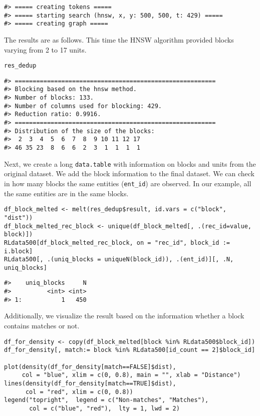 \begin{verbatim}
#> ===== creating tokens =====
#> ===== starting search (hnsw, x, y: 500, 500, t: 429) =====
#> ===== creating graph =====
\end{verbatim}

The results are as follows. This time the HNSW algorithm provided blocks varying from 2 to 17 units.

\begin{verbatim}
res_dedup
\end{verbatim}

\begin{verbatim}
#> ========================================================
#> Blocking based on the hnsw method.
#> Number of blocks: 133.
#> Number of columns used for blocking: 429.
#> Reduction ratio: 0.9916.
#> ========================================================
#> Distribution of the size of the blocks:
#>  2  3  4  5  6  7  8  9 10 11 12 17 
#> 46 35 23  8  6  6  2  3  1  1  1  1
\end{verbatim}

Next, we create a long \texttt{data.table} with information on blocks and units from
the original dataset. We add the block information to the final dataset.
We can check in how many blocks the same entities (\texttt{ent\_id}) are
observed. In our example, all the same entities are in the same blocks.

\begin{verbatim}
df_block_melted <- melt(res_dedup$result, id.vars = c("block", "dist"))
df_block_melted_rec_block <- unique(df_block_melted[, .(rec_id=value, block)])
RLdata500[df_block_melted_rec_block, on = "rec_id", block_id := i.block]
RLdata500[, .(uniq_blocks = uniqueN(block_id)), .(ent_id)][, .N, uniq_blocks]
\end{verbatim}

\begin{verbatim}
#>    uniq_blocks     N
#>          <int> <int>
#> 1:           1   450
\end{verbatim}

Additionally, we visualize the result based on the information whether a
block contains matches or not.

\begin{verbatim}
df_for_density <- copy(df_block_melted[block %in% RLdata500$block_id])
df_for_density[, match:= block %in% RLdata500[id_count == 2]$block_id]

plot(density(df_for_density[match==FALSE]$dist),
     col = "blue", xlim = c(0, 0.8), main = "", xlab = "Distance")
lines(density(df_for_density[match==TRUE]$dist),
      col = "red", xlim = c(0, 0.8))
legend("topright",  legend = c("Non-matches", "Matches"), 
       col = c("blue", "red"),  lty = 1, lwd = 2)
\end{verbatim}

